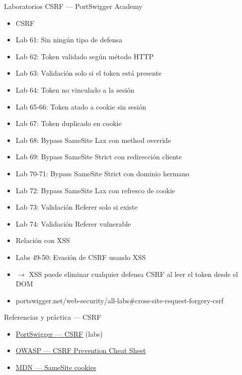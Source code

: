 \documentclass[aspectratio=169,10pt]{beamer}
\begin{document}
\begin{frame}[allowframebreaks]{Laboratorios CSRF --- PortSwigger Academy}
\small
  \begin{itemize}
  \item CSRF
  \item Lab 61: Sin ningún tipo de defensa
  \item Lab 62: Token validado según método HTTP
  \item Lab 63: Validación solo si el token está presente
  \item Lab 64: Token no vinculado a la sesión
  \item Lab 65-66: Token atado a cookie sin sesión
  \item Lab 67: Token duplicado en cookie
  \item Lab 68: Bypass SameSite Lax con method override
  \item Lab 69: Bypass SameSite Strict con redirección cliente
  \item Lab 70-71: Bypass SameSite Strict con dominio hermano
  \item Lab 72: Bypass SameSite Lax con refresco de cookie
  \item Lab 73: Validación Referer solo si existe
  \item Lab 74: Validación Referer vulnerable
  \item Relación con XSS
  \item Labs 49-50: Evasión de CSRF usando XSS
  \item $\rightarrow$ XSS puede eliminar cualquier defensa CSRF al leer el token desde el DOM
  \item portswigger.net/web-security/all-labs\#cross-site-request-forgery-csrf
  \end{itemize}
\end{frame}

\begin{frame}{Referencias y práctica --- CSRF}
\footnotesize
  \begin{itemize}
  \item \href{https://portswigger.net/web-security/csrf}{PortSwigger --- CSRF} (labs)
  \item \href{https://cheatsheetseries.owasp.org/cheatsheets/Cross-Site_Request_Forgery_Prevention_Cheat_Sheet.html}{OWASP --- CSRF Prevention Cheat Sheet}
  \item \href{https://developer.mozilla.org/en-US/docs/Web/HTTP/Headers/Set-Cookie/SameSite}{MDN --- SameSite cookies}
  \end{itemize}
\end{frame}
\end{document}
